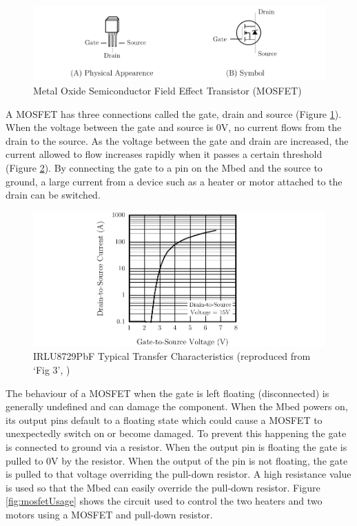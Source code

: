 			\begin{figure}
				\includegraphics[width=1\textwidth]{diagrams/mosfetDiagram.pdf}
				\caption{Metal Oxide Semiconductor Field Effect Transistor (MOSFET)}
				\label{fig:mosfetDiagram}
			\end{figure}
			
			A MOSFET has three connections called the gate, drain and source
			(Figure \ref{fig:mosfetDiagram}). When the voltage between the gate and
			source is 0V, no current flows from the drain to the source. As the
			voltage between the gate and drain are increased, the current allowed to
			flow increases rapidly when it passes a certain threshold (Figure
			\ref{fig:mosfetPerformance}). By connecting the gate to a pin on the
			Mbed and the source to ground, a large current from a device such as a
			heater or motor attached to the drain can be switched.
			
			\begin{figure}
				\includegraphics[width=1\textwidth]{diagrams/mosfetPerformance.pdf}
				\caption{IRLU8729PbF Typical Transfer Characteristics (reproduced from
				`Fig 3', \cite{MOSFET})}
				\label{fig:mosfetPerformance}
			\end{figure}
			
			The behaviour of a MOSFET when the gate is left floating (disconnected) is
			generally undefined and can damage the component. When the Mbed powers on,
			its output pins default to a floating state which could cause a MOSFET to
			unexpectedly switch on or become damaged. To prevent this happening the
			gate is connected to ground via a resistor. When the output pin is
			floating the gate is pulled to 0V by the resistor. When the output of the
			pin is not floating, the gate is pulled to that voltage overriding the
			pull-down resistor. A high resistance value is used so that the Mbed can
			easily override the pull-down resistor. Figure \ref{fig:mosfetUsage} shows
			the circuit used to control the two heaters and two motors using a MOSFET
			and pull-down resistor.
			
